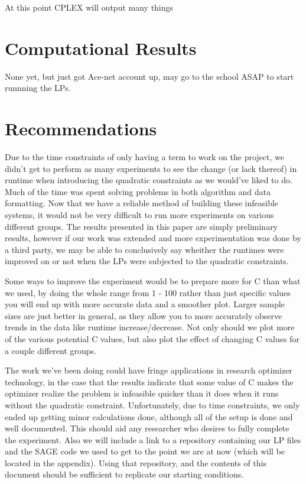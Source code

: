 \documentclass[11pt]{article} %
\theoremstyle{definition}
\theoremstyle{remark}
\begin{document}
At this point CPLEX will output many things

\section{Computational Results}

None yet, but just got Ace-net account up, may go to the school ASAP to start runnning the LPs.

\section{Recommendations}

Due to the time constraints of only having a term to work on the project, we didn't get to perform as many experiments to see the change (or lack thereof) in runtime when introducing the quadratic constraints as we would've liked to do. Much of the time was spent solving problems in both algorithm and data formatting. Now that we have a reliable method of building these infeasible systems, it would not be very difficult to run more experiments on various different groups. The results presented in this paper are simply preliminary results, however if our work was extended and more experimentation was done by a third party, we may be able to conclusively say wheither the runtimes were improved on or not when the LPs were subjected to the quadratic constraints.

Some ways to improve the experiment would be to prepare more for C than what we used, by doing the whole range from 1 - 100 rather than just specific values you will end up with more accurate data and a smoother plot. Larger sample sizes are just better in general, as they allow you to more accurately observe trends in the data like runtime increase/decrease. Not only should we plot more of the various potential C values, but also plot the effect of changing C values for a couple different groups. 

The work we've been doing could have fringe applications in research optimizer technology, in the case that the results indicate that some value of C makes the optimizer realize the problem is infeasible quicker than it does when it runs without the quadratic constraint. Unfortunately, due to time constraints, we only ended up getting minor calculations done, although all of the setup is done and well documented. This should aid any researcher who desires to fully complete the experiment. Also we will include a link to a repository containing our LP files and the SAGE code we used to get to the point we are at now (which will be located in the appendix). Using that repository, and the contents of this document should be sufficient to replicate our starting conditions. 
\end{document}

